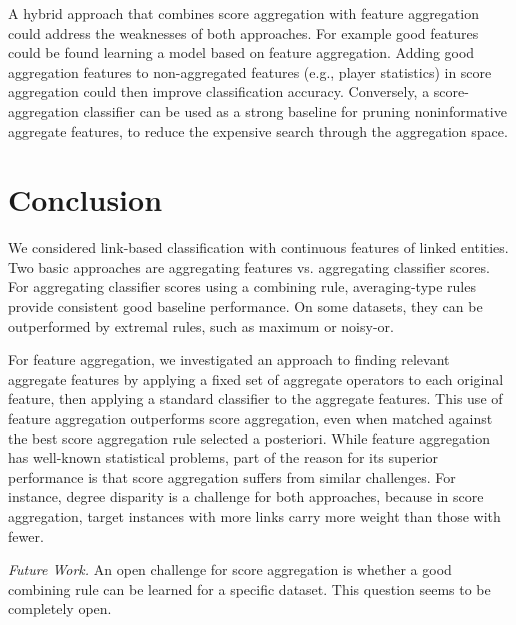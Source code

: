 \documentclass[conference]{IEEEtran}
\begin{document}

A hybrid approach that combines score aggregation with feature aggregation could address the weaknesses of both approaches.
For example good features could be found learning a model based on feature aggregation. Adding  good aggregation features to non-aggregated features (e.g., player statistics) in score aggregation could then improve classification accuracy. Conversely, a score-aggregation classifier can be used as a strong baseline for pruning noninformative aggregate features, to reduce the expensive search through the aggregation space.


\section{Conclusion}


We considered link-based classification with continuous features of linked entities. Two basic approaches are aggregating features vs. aggregating classifier scores. For aggregating classifier scores using a combining rule, averaging-type  rules provide consistent good baseline performance. On some datasets, they can be outperformed by extremal rules, such as maximum or noisy-or.

For feature aggregation, we investigated an approach to finding relevant aggregate features by applying a fixed set of aggregate operators to each original feature, then applying a standard classifier to the aggregate features. This use of feature aggregation outperforms score aggregation, even when matched against the best score aggregation rule selected a posteriori. While feature aggregation has well-known statistical problems, part of the reason for its superior performance is that score aggregation suffers from similar challenges. For instance, degree disparity is a challenge for both approaches, because in score aggregation, target instances with more links carry more weight than those with fewer.

{\em Future Work.} An open challenge for score aggregation is whether a good combining rule can be learned for a specific dataset. This question seems to be completely open.
\end{document}
